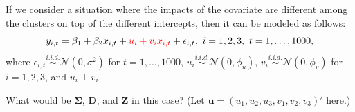 \documentclass[ignorenonframetext,]{beamer}
\begin{document}
\begin{frame}[allowframebreaks]
\begin{exam}
If we consider a situation where the {\color{red} impacts of the covariate are different among the clusters on top of the different intercepts}, then it can be modeled as follows:
$$
y_{i,t} = \beta_1 + \beta_2 {x}_{i,t} + {\color{red}u_i + v_i {x}_{i,t}}+ \epsilon_{i,t}, \ i=1,2,3, \ t=1,\ldots, 1000,
$$
where $\epsilon_{i,t} \overset{i.i.d.}\sim \mathcal{N}(0, \sigma^2)$  for $t=1,\ldots, 1000$, $u_i \overset{i.i.d.}\sim \mathcal{N}(0, \phi_u)$, $v_i \overset{i.i.d.}\sim \mathcal{N}(0, \phi_v)$ for $i=1,2,3$, and $u_i \perp v_i$.

\vspace{8pt}
What would be $\bm{\Sigma}$, $\bm{D}$, and $\bm{Z}$ in this case? (Let $\bm{u}=(u_1, u_2, u_3, v_1,v_2, v_3)'$ here.)

\end{exam}


\end{frame}
\end{document}
